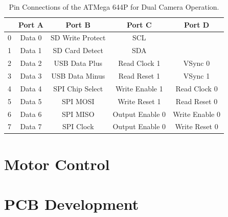 \begin{table}
\centering
\begin{tabular}{|c|c|c|c|c|}\hline
	& 	Port A 	& 	Port B 			& 	Port C 				& 	Port D 		\\ \hline
0	&	Data 0	&	SD Write Protect&	\itc SCL			&					\\
1	&	Data 1	&	SD Card Detect	&	\itc SDA			&					\\
2	&	Data 2	&	USB Data Plus	&	Read Clock 1		&	VSync 0			\\
3	&	Data 3	&	USB Data Minus	&	Read Reset 1		&	VSync 1			\\
4	&	Data 4	&	SPI Chip Select	&	Write Enable 1		&	Read Clock 0	\\
5	&	Data 5	&	SPI	MOSI 		&	Write Reset 1		&	Read Reset 0	\\
6	&	Data 6	&	SPI MISO		&	Output Enable 0		&	Write Enable 0	\\
7	&	Data 7	&	SPI Clock		&	Output Enable 0		&	Write Reset 0	\\
\hline

\end{tabular}
\caption{Pin Connections of the ATMega 644P for Dual Camera Operation.}
\label{table:644Pin}
\end{table}
\section{Motor Control}
\section{PCB Development}
